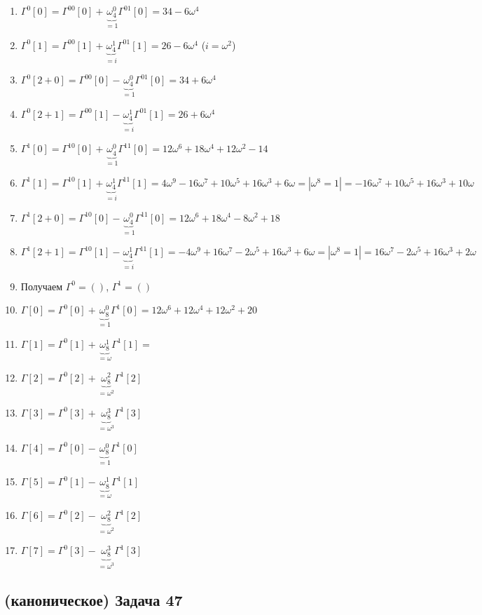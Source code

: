 \documentclass[a4paper]{article}
\begin{document}
\begin{enumerate}
\begin{enumerate}
\item $\Gamma^0[0]=\Gamma^{00}[0]+\underbrace{\omega_4^0}_{=1}\Gamma^{01}[0]=34-6\omega^4$
\item $\Gamma^0[1]=\Gamma^{00}[1]+\underbrace{\omega_4^1}_{=i}\Gamma^{01}[1]=26-6\omega^4$ ($i=\omega^2$)
\item $\Gamma^0[2+0]=\Gamma^{00}[0]-\underbrace{\omega_4^0}_{=1}\Gamma^{01}[0]=34+6\omega^4$
\item $\Gamma^0[2+1]=\Gamma^{00}[1]-\underbrace{\omega_4^1}_{=i}\Gamma^{01}[1]=26+6\omega^4$
\item $\Gamma^1[0]=\Gamma^{10}[0]+\underbrace{\omega_4^0}_{=1}\Gamma^{11}[0]=12\omega^6+18\omega^4+12\omega^2-14$
\item $\Gamma^1[1]=\Gamma^{10}[1]+\underbrace{\omega_4^1}_{=i}\Gamma^{11}[1]=4\omega^9-16\omega^7+10\omega^5+16\omega^3+6\omega=|\omega^8=1|=-16\omega^7+10\omega^5+16\omega^3+10\omega$
\item $\Gamma^1[2+0]=\Gamma^{10}[0]-\underbrace{\omega_4^0}_{=1}\Gamma^{11}[0]=12\omega^6+18\omega^4-8\omega^2+18$
\item $\Gamma^1[2+1]=\Gamma^{10}[1]-\underbrace{\omega_4^1}_{=i}\Gamma^{11}[1]=-4\omega^9+16\omega^7-2\omega^5+16\omega^3+6\omega=|\omega^8=1|=16\omega^7-2\omega^5+16\omega^3+2\omega$
\item Получаем $\Gamma^0=()$, $\Gamma^1=()$
\item $\Gamma[0]=\Gamma^0[0]+\underbrace{\omega_8^0}_{=1}\Gamma^1[0]=12\omega^6+12\omega^4+12\omega^2+20$
\item $\Gamma[1]=\Gamma^0[1]+\underbrace{\omega_8^1}_{=\omega}\Gamma^1[1]=$
\item $\Gamma[2]=\Gamma^0[2]+\underbrace{\omega_8^2}_{=\omega^2}\Gamma^1[2]$
\item $\Gamma[3]=\Gamma^0[3]+\underbrace{\omega_8^3}_{=\omega^3}\Gamma^1[3]$

\item $\Gamma[4]=\Gamma^0[0]-\underbrace{\omega_8^0}_{=1}\Gamma^1[0]$
\item $\Gamma[5]=\Gamma^0[1]-\underbrace{\omega_8^1}_{=\omega}\Gamma^1[1]$
\item $\Gamma[6]=\Gamma^0[2]-\underbrace{\omega_8^2}_{=\omega^2}\Gamma^1[2]$
\item $\Gamma[7]=\Gamma^0[3]-\underbrace{\omega_8^3}_{=\omega^3}\Gamma^1[3]$
\end{enumerate}
\end{enumerate}
\subsection*{(каноническое) Задача 47}
\end{document}

